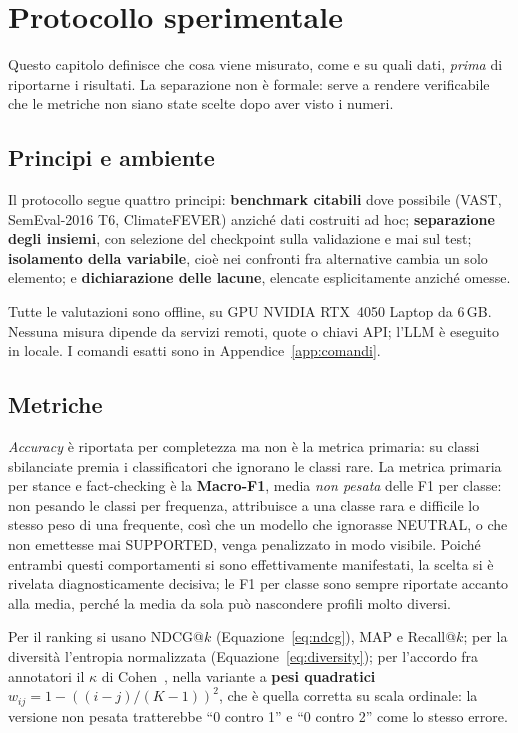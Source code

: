 \documentclass[11pt,a4paper]{report}
\begin{document}
\chapter{Protocollo sperimentale}\label{cap:protocollo}

Questo capitolo definisce che cosa viene misurato, come e su quali dati, \emph{prima} di
riportarne i risultati. La separazione non è formale: serve a rendere verificabile che le
metriche non siano state scelte dopo aver visto i numeri.

\section{Principi e ambiente}
Il protocollo segue quattro principi: \textbf{benchmark citabili} dove possibile (VAST,
SemEval-2016 T6, ClimateFEVER) anziché dati costruiti ad hoc; \textbf{separazione degli insiemi},
con selezione del checkpoint sulla validazione e mai sul test; \textbf{isolamento della
variabile}, cioè nei confronti fra alternative cambia un solo elemento; e \textbf{dichiarazione
delle lacune}, elencate esplicitamente anziché omesse.

Tutte le valutazioni sono offline, su GPU NVIDIA RTX~4050 Laptop da 6\,GB. Nessuna misura dipende
da servizi remoti, quote o chiavi API; l'LLM è eseguito in locale. I comandi esatti sono in
Appendice~\ref{app:comandi}.

\section{Metriche}
\emph{Accuracy} è riportata per completezza ma non è la metrica primaria: su classi sbilanciate
premia i classificatori che ignorano le classi rare. La metrica primaria per stance e
fact-checking è la \textbf{Macro-F1}, media \emph{non pesata} delle F1 per classe: non pesando le
classi per frequenza, attribuisce a una classe rara e difficile lo stesso peso di una frequente,
così che un modello che ignorasse NEUTRAL, o che non emettesse mai SUPPORTED, venga penalizzato in
modo visibile. Poiché entrambi questi comportamenti si sono effettivamente manifestati, la scelta
si è rivelata diagnosticamente decisiva; le F1 per classe sono sempre riportate accanto alla
media, perché la media da sola può nascondere profili molto diversi.

Per il ranking si usano NDCG@$k$ (Equazione~\ref{eq:ndcg}), MAP e Recall@$k$; per la diversità
l'entropia normalizzata (Equazione~\ref{eq:diversity}); per l'accordo fra annotatori il $\kappa$ di
Cohen~\cite{cohen}, nella variante a \textbf{pesi quadratici} $w_{ij} = 1 - ((i-j)/(K-1))^2$, che
è quella corretta su scala ordinale: la versione non pesata tratterebbe ``0 contro 1'' e ``0
contro 2'' come lo stesso errore.
\end{document}
